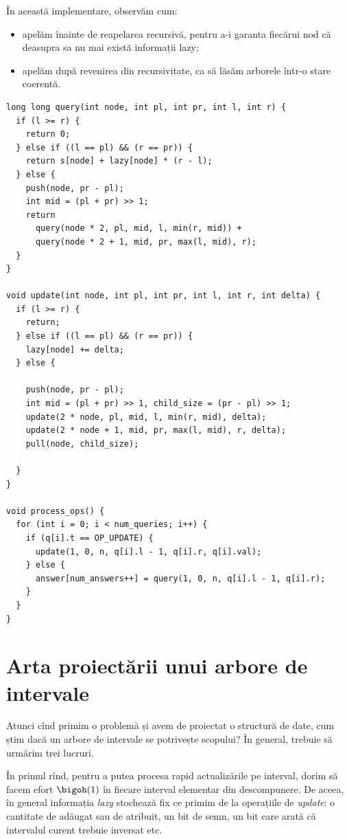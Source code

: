 În această implementare, observăm cum:

\begin{itemize}
  \item apelăm  înainte de reapelarea recursivă, pentru a-i garanta fiecărui nod că deasupra sa nu mai există informații lazy;

  \item apelăm  după revenirea din recursivitate, ca să lăsăm arborele într-o stare coerentă.
\end{itemize}

\begin{verbatim}
long long query(int node, int pl, int pr, int l, int r) {
  if (l >= r) {
    return 0;
  } else if ((l == pl) && (r == pr)) {
    return s[node] + lazy[node] * (r - l);
  } else {
    push(node, pr - pl);
    int mid = (pl + pr) >> 1;
    return
      query(node * 2, pl, mid, l, min(r, mid)) +
      query(node * 2 + 1, mid, pr, max(l, mid), r);
  }
}

void update(int node, int pl, int pr, int l, int r, int delta) {
  if (l >= r) {
    return;
  } else if ((l == pl) && (r == pr)) {
    lazy[node] += delta;
  } else {

    push(node, pr - pl);
    int mid = (pl + pr) >> 1, child_size = (pr - pl) >> 1;
    update(2 * node, pl, mid, l, min(r, mid), delta);
    update(2 * node + 1, mid, pr, max(l, mid), r, delta);
    pull(node, child_size);

  }
}

void process_ops() {
  for (int i = 0; i < num_queries; i++) {
    if (q[i].t == OP_UPDATE) {
      update(1, 0, n, q[i].l - 1, q[i].r, q[i].val);
    } else {
      answer[num_answers++] = query(1, 0, n, q[i].l - 1, q[i].r);
    }
  }
}
\end{verbatim}

\section{Arta proiectării unui arbore de intervale}

Atunci cînd primim o problemă și avem de proiectat o structură de date, cum știm dacă un arbore de intervale se potrivește scopului? În general, trebuie să urmărim trei lucruri.

În primul rînd, pentru a putea procesa rapid actualizările pe interval, dorim să facem efort $\bigoh(1)$ în fiecare interval elementar din descompunere. De aceea, în general informația \textit{lazy} stochează fix ce primim de la operațiile de \textit{update}: o cantitate de adăugat sau de atribuit, un bit de semn, un bit care arată că intervalul curent trebuie inversat etc.

